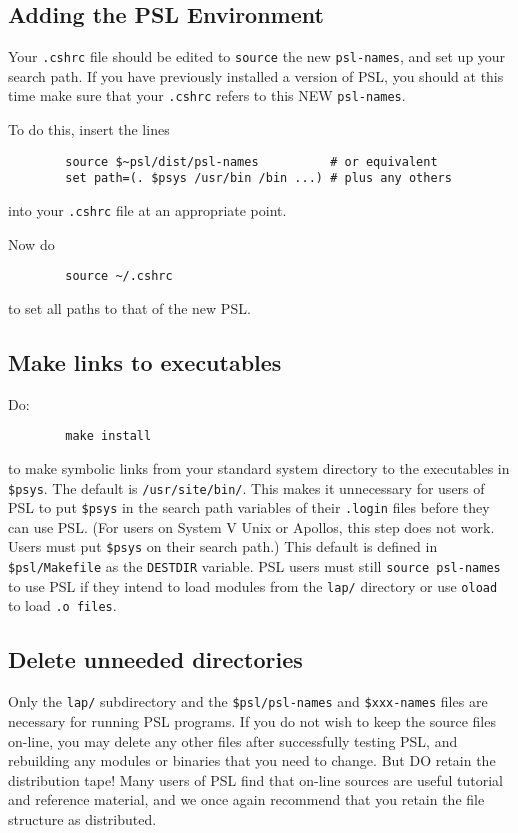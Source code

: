 \subsection{Adding the PSL Environment}

Your {\tt .cshrc} file should be edited to {\tt source} the new
{\tt psl-names}, and set up your search path.  If you have previously
installed a version of PSL, you should at this time make sure that
your {\tt .cshrc} refers to this NEW {\tt psl-names}.

To do this, insert the lines 
\begin{verbatim}
        source $~psl/dist/psl-names          # or equivalent
        set path=(. $psys /usr/bin /bin ...) # plus any others
\end{verbatim}
into your {\tt .cshrc} file at an appropriate point.

Now do
\begin{verbatim}
        source ~/.cshrc
\end{verbatim}
to set all paths to that of the new PSL.

\subsection{Make links to executables}

Do:

\begin{verbatim}
        make install
\end{verbatim}

to make symbolic links from your standard system directory to the
executables in {\tt \$psys}.  The default is {\tt /usr/site/bin/}.
This makes it unnecessary for users of PSL to put {\tt \$psys} in the
search path variables of their {\tt .login} files before they can use
PSL.  (For users on System V Unix or Apollos, this step does not work.
Users must put {\tt \$psys} on their search path.)  This default is
defined in {\tt \$psl/Makefile} as the {\tt DESTDIR} variable.  PSL
users must still {\tt source psl-names} to use PSL if they intend to
load modules from the {\tt lap/} directory or use {\tt oload} to load
{\tt .o files}.

\subsection{Delete unneeded directories}

Only the {\tt lap/} subdirectory and the {\tt \$psl/psl-names} and
{\tt \$xxx-names} files are  necessary for running PSL
programs.  If you do not wish to keep the source files on-line, you
may delete any other files after successfully testing PSL, and
rebuilding any modules or binaries that you need to change.  But DO
retain the distribution tape!  Many users of PSL find that on-line
sources are useful tutorial and reference material, and we once again
recommend that you retain the file structure as distributed.

